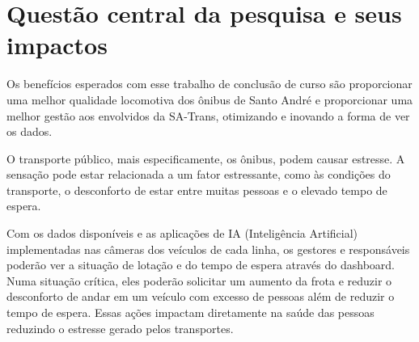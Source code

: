 \section{Questão central da pesquisa e seus impactos}
\indent
\par Os benefícios esperados com esse trabalho de conclusão de curso são proporcionar uma melhor qualidade locomotiva dos ônibus de Santo André e proporcionar uma melhor gestão aos envolvidos da SA-Trans, otimizando e inovando a forma de ver os dados.
\begin{comment}
\section{Sustentabilidade e Impacto ambiental}
\indent
\par Nas grandes cidades o problema da poluição do ar tem-se agravado cada vez mais ameaçando à qualidade de vida de seus habitantes. A poluição carrega diversas substâncias tóxicas que, em contato com o sistema respiratório, podem produzir vários efeitos negativos sobre a saúde.
\par Em geral, os veículos automotores são os principais causadores dessa poluição. Com o auxílio da inteligência artificial e de analytics presentes no dashboard que será disponibilizado, a quantidade de ônibus da cidade poderá sofrer uma possível redução da frota em momentos oportunos. Essa redução pode impactar diretamente e positivamente na emissão de gases para a atmosfera.

\section{Impactos}
\end{comment}
\indent
\par O transporte público, mais especificamente, os ônibus, podem causar estresse. A sensação pode estar relacionada a um fator estressante, como às condições do transporte, o desconforto de estar entre muitas pessoas e o elevado tempo de espera.
\par Com os dados disponíveis e as aplicações de IA (Inteligência Artificial) implementadas nas câmeras dos veículos de cada linha, os gestores e responsáveis poderão ver a situação de lotação e do tempo de espera através do dashboard. Numa situação crítica, eles poderão solicitar um aumento da frota e reduzir o desconforto de andar em um veículo com excesso de pessoas além de reduzir o tempo de espera. Essas ações impactam diretamente na saúde das pessoas reduzindo o estresse gerado pelos transportes.
